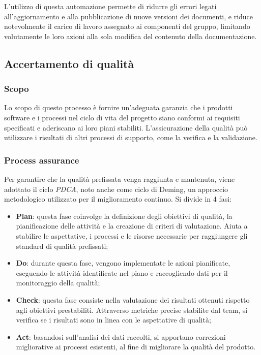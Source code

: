 \documentclass[10pt, a4paper]{article}
\begin{document}
L'utilizzo di questa automazione permette di ridurre gli errori legati all'aggiornamento e alla pubblicazione di nuove
versioni dei documenti, e riduce notevolmente il carico di lavoro assegnato ai componenti del gruppo, limitando
volutamente le loro azioni alla sola modifica del contenuto della documentazione.


\subsection{Accertamento di qualità}
\subsubsection{Scopo}
Lo scopo di questo processo è fornire un'adeguata garanzia che i prodotti software e i processi nel ciclo di vita del progetto siano conformi ai requisiti specificati e aderiscano ai loro piani stabiliti.
L'assicurazione della qualità può utilizzare i risultati di altri processi di supporto, come la verifica e la validazione.

\subsubsection{Process assurance}
Per garantire che la qualità prefissata venga raggiunta e mantenuta, viene adottato il ciclo \textit{PDCA\pg}, noto anche come ciclo di Deming, un approccio metodologico utilizzato per il miglioramento continuo. Si divide in 4 fasi:
\begin{itemize}
    \item \textbf{Plan}: questa fase coinvolge la definizione degli obiettivi di qualità, la pianificazione delle attività e la creazione di criteri di valutazione. Aiuta a stabilire le aspettative, i processi e le risorse necessarie per raggiungere gli standard di qualità prefissati;
    \item \textbf{Do}: durante questa fase, vengono implementate le azioni pianificate, eseguendo le attività identificate nel piano e raccogliendo dati per il monitoraggio della qualità;
    \item \textbf{Check}: questa fase consiste nella valutazione dei risultati ottenuti rispetto agli obiettivi prestabiliti. Attraverso metriche precise stabilite dal team, si verifica se i risultati sono in linea con le aspettative di qualità;
    \item \textbf{Act}: basandosi sull'analisi dei dati raccolti, si apportano correzioni migliorative ai processi esistenti, al fine di migliorare la qualità del prodotto.
\end{itemize}
\end{document}
